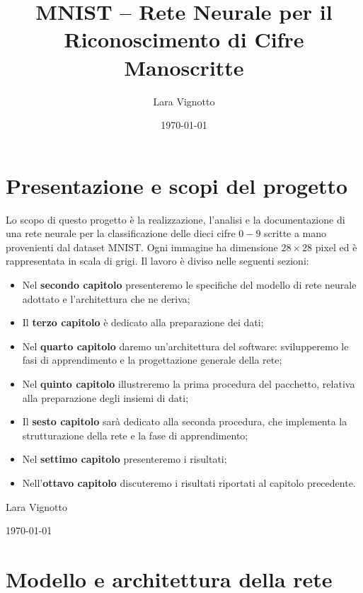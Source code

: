 \documentclass[a4paper,12pt]{article}
\title{\textbf{MNIST – Rete Neurale per il Riconoscimento di Cifre Manoscritte}}
\author{Lara Vignotto}
\date{\today}
\begin{document}
\maketitle
\vfill
\tableofcontents


\newpage
\section{Presentazione e scopi del progetto}
Lo scopo di questo progetto è la realizzazione, l'analisi e la documentazione di una rete neurale per la classificazione delle dieci cifre $0-9$ scritte a mano provenienti dal dataset MNIST. Ogni immagine ha
dimensione $28\times28$ pixel ed è rappresentata in scala di grigi. Il lavoro è diviso nelle seguenti sezioni:
\begin{itemize}
    \item Nel \textbf{secondo capitolo} presenteremo le specifiche del modello di rete neurale adottato e l'architettura che ne deriva;
    \item Il \textbf{terzo capitolo} è dedicato alla preparazione dei dati;
    \item Nel \textbf{quarto capitolo} daremo un'architettura del software: svilupperemo le fasi di apprendimento e la progettazione generale della rete;
    \item Nel \textbf{quinto capitolo} illustreremo la prima procedura del pacchetto, relativa alla preparazione degli insiemi di dati;
    \item Il \textbf{sesto capitolo} sarà dedicato alla seconda procedura, che implementa la strutturazione della rete e la fase di apprendimento;
    \item Nel \textbf{settimo capitolo} presenteremo i risultati;
    \item Nell'\textbf{ottavo capitolo} discuteremo i risultati riportati al capitolo precedente.
\end{itemize}

\vfill
\hfill Lara Vignotto

\hfill \today




\newpage
\section{Modello e architettura della rete} %
\end{document}
